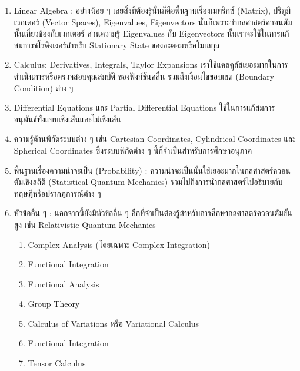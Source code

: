 \begin{enumerate}[topsep=0pt,noitemsep]
    \setlength\itemsep{1em}
    \item Linear Algebra : อย่างน้อย ๆ เลยสิ่งที่ต้องรู้นั่นก็คือพื้นฐานเรื่องเมทริกซ์ (Matrix), ปริภูมิเวกเตอร์ (Vector Spaces),
          Eigenvalues, Eigenvectors นั่นก็เพราะว่ากลศาสตร์ควอนตัมนั้นเกี่ยวข้องกับเวกเตอร์ ส่วนความรู้ Eigenvalues กับ Eigenvectors
          นั้นเราจะใช้ในการแก้สมการชโรดิงเงอร์สำหรับ Stationary State ของอะตอมหรือโมเลกุล

    \item Calculus: Derivatives, Integrals, Taylor Expansions เราใช้แคลคูลัสเยอะมากในการดำเนินการหรือตรวจสอบคุณสมบัติ%
          ของฟังก์ชันคลื่น รวมถึงเงื่อนไขขอบเขต (Boundary Condition) ต่าง ๆ

    \item Differential Equations และ Partial Differential Equations ใช้ในการแก้สมการอนุพันธ์ทั้งแบบเชิงเส้นและไม่เชิงเส้น

    \item ความรู้ด้านพิกัดระบบต่าง ๆ เช่น Cartesian Coordinates, Cylindrical Coordinates และ Spherical Coordinates
          ซึ่งระบบพิกัดต่าง ๆ นี้ก็จำเป็นสำหรับการศึกษาอนุภาค

    \item พื้นฐานเรื่องความน่าจะเป็น (Probability) : ความน่าจะเป็นนั้นใช้เยอะมากในกลศาสตร์ควอนตัมเชิงสถิติ (Statistical Quantum
          Mechanics) รวมไปถึงการนำกลศาสตร์ไปอธิบายกับทฤษฎีหรือปรากฏการณ์ต่าง ๆ

    \item หัวข้ออื่น ๆ : นอกจากนี้ยังมีหัวข้ออื่น ๆ อีกที่จำเป็นต้องรู้สำหรับการศึกษากลศาสตร์ควอนตัมขั้นสูง เช่น Relativistic Quantum
          Mechanics
          \begin{enumerate}[noitemsep]
              \setlength\itemsep{0.5em}
              \item Complex Analysis (โดยเฉพาะ Complex Integration)

              \item Functional Integration

              \item Functional Analysis

              \item Group Theory

              \item Calculus of Variations หรือ Variational Calculus

              \item Functional Integration

              \item Tensor Calculus
          \end{enumerate}
\end{enumerate}

